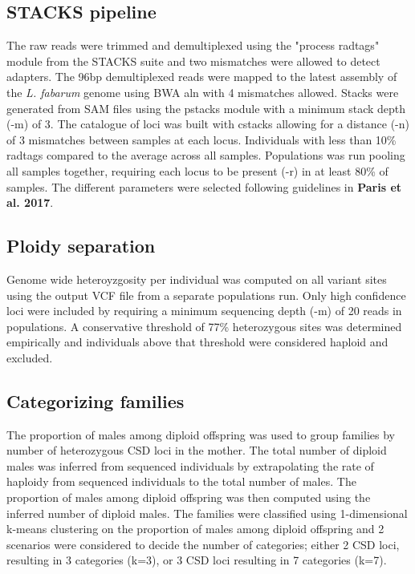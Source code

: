 \documentclass[11pt,a4paper]{report}
\begin{document}
\subsection*{STACKS pipeline}
The raw reads were trimmed and demultiplexed using the "process radtags" module from the STACKS suite and two mismatches were allowed to detect adapters. The 96bp demultiplexed reads were mapped to the latest assembly of the \textit{L. fabarum} genome using BWA aln with 4 mismatches allowed. Stacks were generated from SAM files using the pstacks module with a minimum stack depth (-m) of 3. The catalogue of loci was built with cstacks allowing for a distance (-n) of 3 mismatches between samples at each locus. Individuals with less than 10\% radtags compared to the average across all samples. Populations was run pooling all samples together, requiring each locus to be present (-r) in at least 80\% of samples. The different parameters were selected following guidelines in \textbf{Paris et al. 2017}.

\subsection*{Ploidy separation}
Genome wide heteroyzgosity per individual was computed on all variant sites using the output VCF file from a separate populations run. Only high confidence loci were included by requiring a minimum sequencing depth (-m) of 20 reads in populations. A conservative threshold of 77\% heterozygous sites was determined empirically and individuals above that threshold were considered haploid and excluded.

\subsection*{Categorizing families}
The proportion of males among diploid offspring was used to group families by number of heterozygous CSD loci in the mother. The total number of diploid males was inferred from sequenced individuals by extrapolating the rate of haploidy from sequenced individuals to the total number of males. The proportion of males among diploid offspring was then computed using the inferred number of diploid males. The families were classified using 1-dimensional k-means clustering on the proportion of males among diploid offspring and 2 scenarios were considered to decide the number of categories; either 2 CSD loci, resulting in 3 categories (k=3), or 3 CSD loci resulting in 7 categories (k=7).
\end{document}
